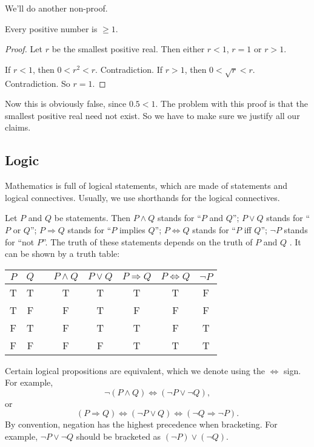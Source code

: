 \documentclass[a4paper]{article}
\begin{document}
We'll do another non-proof.
\begin{prop}
  Every positive number is $\geq 1$.
\end{prop}

\begin{proof}
  Let $r$ be the smallest positive real. Then either $r < 1$, $r = 1$ or $r > 1$.

  If $r < 1$, then $0 < r^2 < r$. Contradiction. If $r > 1$, then $0 < \sqrt{r} < r$. Contradiction. So $r = 1$.
\end{proof}
Now this is obviously false, since $0.5 < 1$. The problem with this proof is that the smallest positive real need not exist. So we have to make sure we justify all our claims.

\subsection{Logic}
Mathematics is full of logical statements, which are made of statements and logical connectives. Usually, we use shorthands for the logical connectives.

Let $P$ and $Q$ be statements. Then $P\wedge Q$ stands for ``$P$ and $Q$''; $P\vee Q$ stands for ``$P$ or $Q$''; $P\Rightarrow Q$ stands for ``$P$ implies $Q$''; $P\Leftrightarrow Q$ stands for ``$P$ iff $Q$''; $\neg P$ stands for ``not $P$''. The truth of these statements depends on the truth of $P$ and $Q$ . It can be shown by a truth table:
\begin{center}
  \begin{tabular}{cccccccc}
    \toprule
    $P$ & $Q$ &\quad &$P\wedge Q$ & $P\vee Q$ & $P\Rightarrow Q$ & $P\Leftrightarrow Q$ & $\neg P$ \\
    \midrule
    T & T & & T & T & T & T & F\\
    T & F & & F & T & F & F & F\\
    F & T & & F & T & T & F & T\\
    F & F & & F & F & T & T & T\\
    \bottomrule
  \end{tabular}
\end{center}
Certain logical propositions are equivalent, which we denote using the $\Leftrightarrow$ sign. For example,
\[
  \neg(P\wedge Q) \Leftrightarrow (\neg P\vee \neg Q),
\]
or
\[
  (P\Rightarrow Q) \Leftrightarrow (\neg P\vee Q) \Leftrightarrow (\neg Q\Rightarrow \neg P).
\]
By convention, negation has the highest precedence when bracketing. For example, $\neg P\vee \neg Q$ should be bracketed as $(\neg P)\vee (\neg Q)$.
\end{document}
